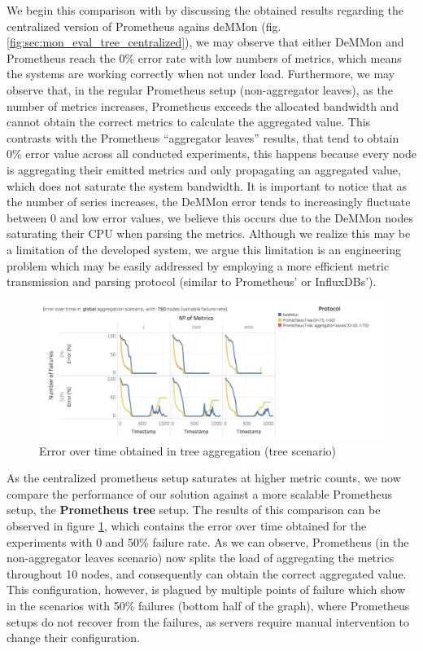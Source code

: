 We begin this comparison with by discussing the obtained results regarding the centralized version of Prometheus agains deMMon (fig. \ref{fig:sec:mon_eval_tree_centralized}), we may observe that either DeMMon and Prometheus reach the 0\% error rate with low numbers of metrics, which means the systems are working correctly when not under load. Furthermore, we may observe that, in the regular Prometheus setup (non-aggregator leaves), as the number of metrics increases, Prometheus exceeds the allocated bandwidth and cannot obtain the correct metrics to calculate the aggregated value. This contrasts with the Prometheus ``aggregator leaves'' results, that tend to obtain 0\% error value across all conducted experiments, this happens because every node is aggregating their emitted metrics and only propagating an aggregated value, which does not saturate the system bandwidth. It is important to notice that as the number of series increases, the DeMMon error tends to increasingly fluctuate between 0 and low error values, we believe this occurs due to the DeMMon nodes saturating their CPU when parsing the metrics. Although we realize this may be a limitation of the developed system, we argue this limitation is an engineering problem which may be easily addressed by employing a more efficient metric transmission and parsing protocol (similar to Prometheus' or InfluxDBs').


\begin{figure}
    \centering
    \includegraphics[width=\linewidth]{Chapters/evaluation/figures/aggregation/Error_over_time_global_tree.jpg}
    \caption{Error over time obtained in tree aggregation (tree scenario)}
    \label{fig:sec:mon_eval_tree_tree}
\end{figure}

As the centralized prometheus setup saturates at higher metric counts, we now compare the performance of our solution against a more scalable Prometheus setup, the \textbf{Prometheus tree} setup. The results of this comparison can be observed in figure \ref{fig:sec:mon_eval_tree_tree}, which contains the error over time obtained for the experiments with 0 and 50\% failure rate. As we can observe, Prometheus (in the non-aggregator leaves scenario) now splits the load of aggregating the metrics throughout 10 nodes, and consequently can obtain the correct aggregated value. This configuration, however, is plagued by multiple points of failure which show in the scenarios with 50\% failures (bottom half of the graph), where Prometheus setups do not recover from the failures, as servers require manual intervention to change their configuration.


